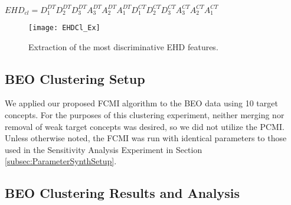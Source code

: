 \documentclass[12pt,dvips]{report}
\numberwithin{equation}{section}
\begin{document}
$EHD_{cl}= D^{DT}_1 D^{DT}_2 D^{DT}_3 A^{DT}_3 A^{DT}_2 A^{DT}_1 D^{CT}_1 D^{CT}_2 D^{CT}_3 A^{CT}_3 A^{CT}_2 A^{CT}_1$


\begin{figure}[htb] \texttt{[image: EHDCl\_Ex]}
\caption{Extraction of the most discriminative EHD features.}
\label{fig:EHDCl_Ex}
\end{figure}




\subsection{BEO Clustering Setup} \label{subsec:BEOClusteringSetup}

We applied our proposed FCMI algorithm to the BEO data using 10 target concepts.  For the purposes of this clustering experiment, neither merging nor removal of weak target concepts was desired, so we did not utilize the PCMI.  Unless otherwise noted, the FCMI was run with identical parameters to those used in the Sensitivity Analysis Experiment in Section \ref{subsec:ParameterSynthSetup}.

\subsection{BEO Clustering Results and Analysis}
\end{document}
